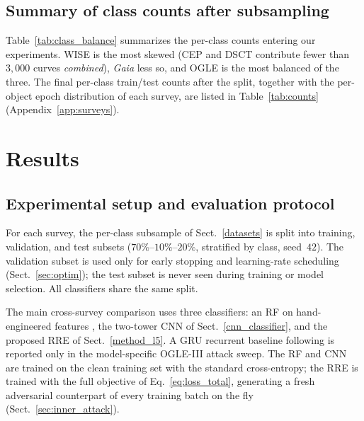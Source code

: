 \documentclass{aa}
\begin{document}
\subsection{Summary of class counts after subsampling}

Table~\ref{tab:class_balance} summarizes the per-class counts entering our experiments. WISE is the most skewed (CEP and DSCT contribute fewer than $3{,}000$ curves \emph{combined}), \textit{Gaia} less so, and OGLE is the most balanced of the three. The final per-class train/test counts after the split, together with the per-object epoch distribution of each survey, are listed in Table~\ref{tab:counts} (Appendix~\ref{app:surveys}).




\section{Results} \label{results}

\subsection{Experimental setup and evaluation protocol}
\label{results_setup}

For each survey, the per-class subsample of Sect.~\ref{datasets} is split into training, validation, and test subsets ($70\%$--$10\%$--$20\%$, stratified by class, seed~$42$). The validation subset is used only for early stopping and learning-rate scheduling (Sect.~\ref{sec:optim}); the test subset is never seen during training or model selection. All classifiers share the same split.

The main cross-survey comparison uses three classifiers: an RF on hand-engineered features \citep[FATS;][]{nun2015fats}, the two-tower CNN of Sect.~\ref{cnn_classifier}, and the proposed RRE of Sect.~\ref{method_l5}. A GRU recurrent baseline following \citet{donoso2021effect} is reported only in the model-specific OGLE-III attack sweep. The RF and CNN are trained on the clean training set with the standard cross-entropy; the RRE is trained with the full objective of Eq.~\eqref{eq:loss_total}, generating a fresh adversarial counterpart of every training batch on the fly (Sect.~\ref{sec:inner_attack}).
\end{document}
